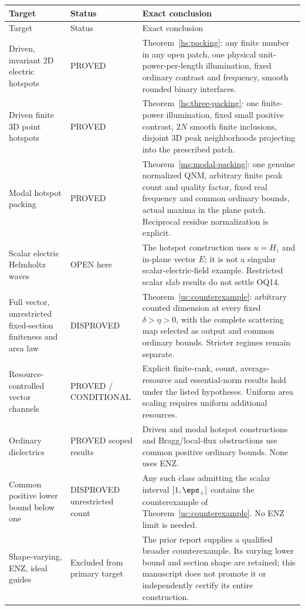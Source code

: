 \begin{longtable}{@{}p{}p{}p{}@{}}
\toprule Target & Status & Exact conclusion\\\midrule\endfirsthead
\toprule Target & Status & Exact conclusion\\\midrule\endhead
Driven, invariant 2D electric hotspots & PROVED & Theorem~\ref{hs:packing}: any finite number in any open patch, one physical unit-power-per-length illumination, fixed ordinary contrast and frequency, smooth rounded binary interfaces.\\[3pt]
Driven finite 3D point hotspots & PROVED & Theorem~\ref{hs:three-packing}: one finite-power illumination, fixed small positive contrast, $2N$ smooth finite inclusions, disjoint 3D peak neighborhoods projecting into the prescribed patch.\\[3pt]
Modal hotspot packing & PROVED & Theorem~\ref{ms:modal-packing}: one genuine normalized QNM, arbitrary finite peak count and quality factor, fixed real frequency and common ordinary bounds, actual maxima in the plane patch. Reciprocal residue normalization is explicit.\\[3pt]
Scalar electric Helmholtz waves & OPEN here & The hotspot construction uses $u=H_z$ and in-plane vector $E$; it is not a singular scalar-electric-field example. Restricted scalar slab results do not settle OQ14.\\[3pt]
Full vector, unrestricted fixed-section finiteness and area law & DISPROVED & Theorem~\ref{uc:counterexample}: arbitrary counted dimension at every fixed $\delta>\eta>0$, with the complete scattering map selected as output and common ordinary bounds. Stricter regimes remain separate.\\[3pt]
Resource-controlled vector channels & PROVED / CONDITIONAL & Explicit finite-rank, count, average-resource and essential-norm results hold under the listed hypotheses. Uniform area scaling requires uniform additional resources.\\[3pt]
Ordinary dielectrics & PROVED scoped results & Driven and modal hotspot constructions and Bragg/local-flux obstructions use common positive ordinary bounds. None uses ENZ.\\[3pt]
Common positive lower bound below one & DISPROVED unrestricted count & Any such class admitting the scalar interval $[1,\eps_+]$ contains the counterexample of Theorem~\ref{uc:counterexample}. No ENZ limit is needed.\\[3pt]
Shape-varying, ENZ, ideal guides & Excluded from primary target & The prior report supplies a qualified broader counterexample. Its varying lower bound and section shape are retained; this manuscript does not promote it or independently certify its entire construction.\\[3pt]

\end{longtable}

